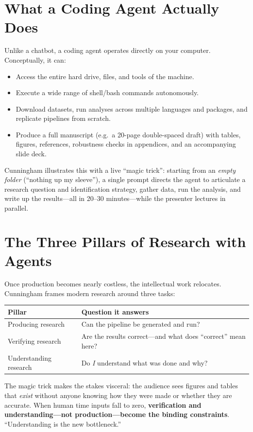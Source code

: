 \documentclass[11pt]{article}
\begin{document}
\section{What a Coding Agent Actually Does}
Unlike a chatbot, a coding agent operates directly on your computer. Conceptually,
it can:
\begin{itemize}[leftmargin=1.5em]
  \item Access the entire hard drive, files, and tools of the machine.
  \item Execute a wide range of shell/bash commands autonomously.
  \item Download datasets, run analyses across multiple languages and packages, and replicate pipelines from scratch.
  \item Produce a full manuscript (e.g.\ a 20-page double-spaced draft) with tables, figures, references, robustness checks in appendices, and an accompanying slide deck.
\end{itemize}
Cunningham illustrates this with a live ``magic trick'': starting from an
\emph{empty folder} (``nothing up my sleeve''), a single prompt directs the agent
to articulate a research question and identification strategy, gather data, run
the analysis, and write up the results---all in 20--30 minutes---while the
presenter lectures in parallel.

\section{The Three Pillars of Research with Agents}
Once production becomes nearly costless, the intellectual work relocates.
Cunningham frames modern research around three tasks:
\begin{center}
\begin{tabular}{@{}ll@{}}
\toprule
\textbf{Pillar} & \textbf{Question it answers} \\
\midrule
Producing research   & Can the pipeline be generated and run? \\
Verifying research   & Are the results correct---and what does ``correct'' mean here? \\
Understanding research & Do \emph{I} understand what was done and why? \\
\bottomrule
\end{tabular}
\end{center}
The magic trick makes the stakes visceral: the audience sees figures and tables
that \emph{exist} without anyone knowing how they were made or whether they are
accurate. When human time inputs fall to zero, \textbf{verification and
understanding---not production---become the binding constraints}. ``Understanding
is the new bottleneck.''
\end{document}
